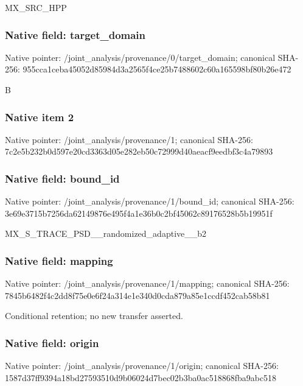 \documentclass[10pt,a4paper]{article}
\begin{document}
\begingroup\raggedright\sloppy MX\_\allowbreak{}SRC\_\allowbreak{}HPP\par\endgroup

\subsubsection{Native field: target\_\allowbreak{}domain}
Native pointer: /joint\_\allowbreak{}analysis/provenance/0/target\_\allowbreak{}domain; canonical SHA-256: 955cca1ceba45052d85984d3a2565f4ce25b7488602c60a165598bf80b26e472

\begingroup\raggedright\sloppy B\par\endgroup

\subsubsection{Native item 2}
Native pointer: /joint\_\allowbreak{}analysis/provenance/1; canonical SHA-256: 7c2e5b232b0d597e20cd3363d05e282eb50c72999d40aeacf9eedbf3c4a79893

\subsubsection{Native field: bound\_\allowbreak{}id}
Native pointer: /joint\_\allowbreak{}analysis/provenance/1/bound\_\allowbreak{}id; canonical SHA-256: 3e69e3715b7256da62149876e495f4a1e36b0c2bf45062c89176528b5b19951f

\begingroup\raggedright\sloppy MX\_\allowbreak{}S\_\allowbreak{}TRACE\_\allowbreak{}PSD\_\allowbreak{}\_\allowbreak{}randomized\_\allowbreak{}adaptive\_\allowbreak{}\_\allowbreak{}b2\par\endgroup

\subsubsection{Native field: mapping}
Native pointer: /joint\_\allowbreak{}analysis/provenance/1/mapping; canonical SHA-256: 7845b6482f4c2dd8f75e0e6f24a314e1e340d0cda879a85e1ccdf452cab58b81

\begingroup\raggedright\sloppy Conditional retention;\allowbreak{} no new transfer asserted.\par\endgroup

\subsubsection{Native field: origin}
Native pointer: /joint\_\allowbreak{}analysis/provenance/1/origin; canonical SHA-256: 1587d37ff9394a18bd27593510d9b06024d7bec02b3ba0ac518868fba9abc518
\end{document}
